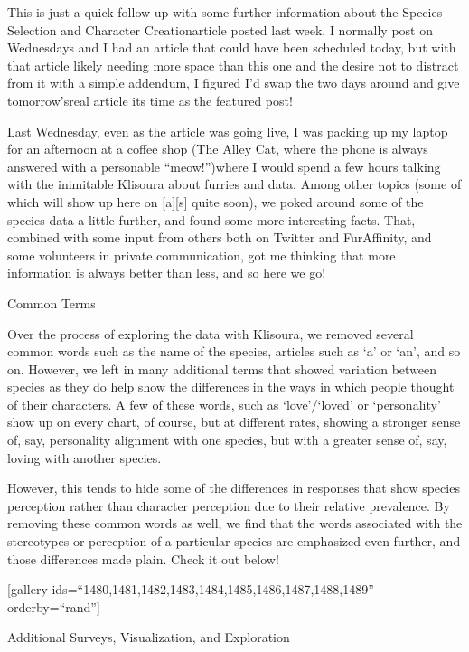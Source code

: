 
This is just a quick follow-up with some further information about the Species Selection and Character Creationarticle posted last week. I normally post on Wednesdays and I had an article that could have been scheduled today, but with that article likely needing more space than this one and the desire not to distract from it with a simple addendum, I figured I'd swap the two days around and give tomorrow'sreal article its time as the featured post!

Last Wednesday, even as the article was going live, I was packing up my laptop for an afternoon at a coffee shop (The Alley Cat, where the phone is always answered with a personable ``meow!'')where I would spend a few hours talking with the inimitable Klisoura about furries and data. Among other topics (some of which will show up here on {[}a{]}{[}s{]} quite soon), we poked around some of the species data a little further, and found some more interesting facts. That, combined with some input from others both on Twitter and FurAffinity, and some volunteers in private communication, got me thinking that more information is always better than less, and so here we go!

Common Terms

Over the process of exploring the data with Klisoura, we removed several common words such as the name of the species, articles such as `a' or `an', and so on. However, we left in many additional terms that showed variation between species as they do help show the differences in the ways in which people thought of their characters. A few of these words, such as `love'/`loved' or `personality' show up on every chart, of course, but at different rates, showing a stronger sense of, say, personality alignment with one species, but with a greater sense of, say, loving with another species.

However, this tends to hide some of the differences in responses that show species perception rather than character perception due to their relative prevalence. By removing these common words as well, we find that the words associated with the stereotypes or perception of a particular species are emphasized even further, and those differences made plain. Check it out below!

{[}gallery ids=``1480,1481,1482,1483,1484,1485,1486,1487,1488,1489'' orderby=``rand''{]}

Additional Surveys, Visualization, and Exploration

